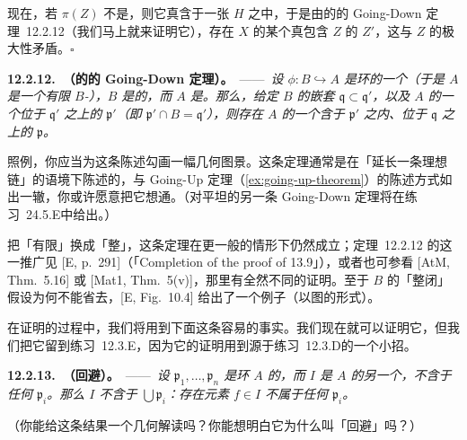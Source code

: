 现在，若 $\pi(Z)$ 不是\trHypersurface，则它真含于一张\trIrreducible\trHypersurface{} $H$ 之中，于是由\trIntegrallyClosed{}\trIntegralDomain{}的\trFinite\trExtension{}的 Going-Down 定理~12.2.12（我们马上就来证明它），存在 $X$ 的某个真包含 $Z$ 的\trIrreducible\trClosedSubset{} $Z'$，这与 $Z$ 的极大性矛盾。\hfill$\square$

\textbf{12.2.12.\ \trhTheorem{}（\trIntegrallyClosed{}\trIntegralDomain{}的\trFinite\trExtension{}的 Going-Down 定理）。}\ ——\ \emph{设 $\phi\colon B\hookrightarrow A$ 是环的一个\trFinite\trExtension{}（于是 $A$ 是一个有限 $B$-\trModule），$B$ 是\trIntegrallyClosed{}的\trIntegralDomain，而 $A$ 是\trIntegralDomain。那么，给定 $B$ 的嵌套\trPrimeIdeal{} $\mathfrak{q}\subset\mathfrak{q}'$，以及 $A$ 的一个位于 $\mathfrak{q}'$ 之上的\trPrimeIdeal{} $\mathfrak{p}'$（即 $\mathfrak{p}'\cap B=\mathfrak{q}'$），则存在 $A$ 的一个含于 $\mathfrak{p}'$ 之内、位于 $\mathfrak{q}$ 之上的\trPrimeIdeal{} $\mathfrak{p}$。}

照例，你应当为这条陈述勾画一幅几何图景。这条定理通常是在「延长一条理想链」的语境下陈述的，与 Going-Up 定理（\cref{ex:going-up-theorem}）的陈述方式如出一辙，你或许愿意把它想通。（对平坦\trMorphism{}的另一条 Going-Down 定理将在\mbox{练习~24.5.E}中给出。）

把「有限」换成「整」，这条定理在更一般的情形下仍然成立；定理~12.2.12 的这一推广见 [E, p.~291]（「Completion of the proof of 13.9」），或者也可参看 [AtM, Thm.~5.16] 或 [Mat1, Thm.~5(v)]，那里有全然不同的证明。至于 $B$ 的「整闭」假设为何不能省去，[E, Fig.~10.4] 给出了一个例子（以图的形式）。

在证明的过程中，我们将用到下面这条容易的事实。我们现在就可以证明它，但我们把它留到\mbox{练习~12.3.E}，因为它的证明用到源于\mbox{练习~12.3.D}的一个小招。

\textbf{12.2.13.\ \trhProposition{}（\trPrimeIdeal{}回避）。}\ ——\ \emph{设 $\mathfrak{p}_1,\dots,\mathfrak{p}_n$ 是环 $A$ 的\trPrimeIdeal，而 $I$ 是 $A$ 的另一个\trIdeal，不含于任何 $\mathfrak{p}_i$。那么 $I$ 不含于 $\bigcup\mathfrak{p}_i$：存在元素 $f\in I$ 不属于任何 $\mathfrak{p}_i$。}

（你能给这条结果一个几何解读吗？你能想明白它为什么叫「\trPrimeIdeal{}回避」吗？）


